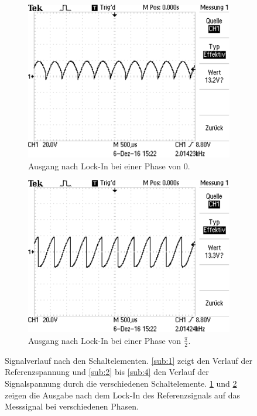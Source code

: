 \begin{figure}
\begin{subfigure}{0.45\textwidth}
    \centering
    \includegraphics[width=\textwidth]{5.png}
    \caption{Ausgang nach Lock-In bei einer Phase von \num{0}.}
    \label{sub:5}
    \qquad
  \end{subfigure}
  \begin{subfigure}{0.45\textwidth}
    \centering
    \includegraphics[width=\textwidth]{6.png}
    \caption{Ausgang nach Lock-In bei einer Phase von $\frac{\si{\pi}}{\num{2}}$.}
    \label{sub:6}
    \qquad
  \end{subfigure}
  \caption{Signalverlauf nach den Schaltelementen. \ref{sub:1} zeigt den Verlauf der Referenzspannung und
  \ref{sub:2} bis \ref{sub:4} den Verlauf der Signalspannung durch die verschiedenen Schaltelemente.
  \ref{sub:5} und \ref{sub:6} zeigen die Ausgabe nach dem Lock-In des Referenzsignals auf das Messsignal bei
  verschiedenen Phasen.}
  \label{fig:5}
\end{figure}
